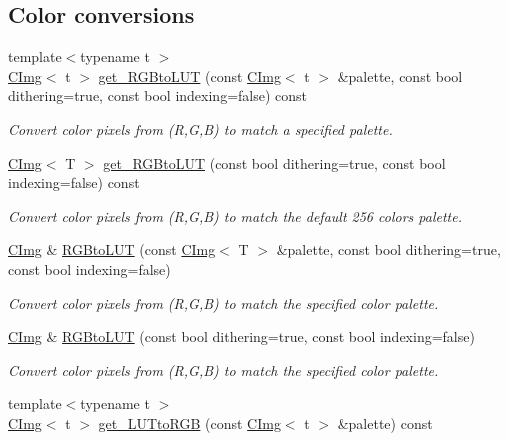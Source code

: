 \subsection*{Color conversions}
\label{_amgrp620c7041041c18aac4c3f566acd22f46}
 \begin{DoxyCompactItemize}
\item 
{\footnotesize template$<$typename t $>$ }\\\hyperlink{structcimg__library_1_1_c_img}{CImg}$<$ t $>$ \hyperlink{structcimg__library_1_1_c_img_a42074afcc6368e1bcaf0532f61123492}{get\_\-RGBtoLUT} (const \hyperlink{structcimg__library_1_1_c_img}{CImg}$<$ t $>$ \&palette, const bool dithering=true, const bool indexing=false) const 
\begin{DoxyCompactList}\small\item\em Convert color pixels from (R,G,B) to match a specified palette. \item\end{DoxyCompactList}\item 
\hyperlink{structcimg__library_1_1_c_img}{CImg}$<$ T $>$ \hyperlink{structcimg__library_1_1_c_img_a21e9195be99dcd4db84faf8e7b8f52f4}{get\_\-RGBtoLUT} (const bool dithering=true, const bool indexing=false) const 
\begin{DoxyCompactList}\small\item\em Convert color pixels from (R,G,B) to match the default 256 colors palette. \item\end{DoxyCompactList}\item 
\hyperlink{structcimg__library_1_1_c_img}{CImg} \& \hyperlink{structcimg__library_1_1_c_img_abcf750a4bb72227df700b69ca7272c1e}{RGBtoLUT} (const \hyperlink{structcimg__library_1_1_c_img}{CImg}$<$ T $>$ \&palette, const bool dithering=true, const bool indexing=false)
\begin{DoxyCompactList}\small\item\em Convert color pixels from (R,G,B) to match the specified color palette. \item\end{DoxyCompactList}\item 
\hyperlink{structcimg__library_1_1_c_img}{CImg} \& \hyperlink{structcimg__library_1_1_c_img_ad63792a32667c1588c6e74dd85c698cf}{RGBtoLUT} (const bool dithering=true, const bool indexing=false)
\begin{DoxyCompactList}\small\item\em Convert color pixels from (R,G,B) to match the specified color palette. \item\end{DoxyCompactList}\item 
\hypertarget{structcimg__library_1_1_c_img_a1dd7d85de2946959eb7d05b521703e1d}{
{\footnotesize template$<$typename t $>$ }\\\hyperlink{structcimg__library_1_1_c_img}{CImg}$<$ t $>$ \hyperlink{structcimg__library_1_1_c_img_a1dd7d85de2946959eb7d05b521703e1d}{get\_\-LUTtoRGB} (const \hyperlink{structcimg__library_1_1_c_img}{CImg}$<$ t $>$ \&palette) const }
\label{structcimg__library_1_1_c_img_a1dd7d85de2946959eb7d05b521703e1d}


\end{DoxyCompactItemize}
